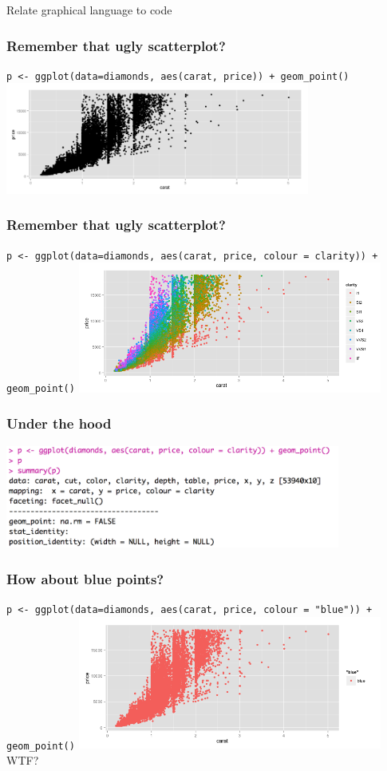 \documentclass{beamer}
\begin{document}
\begin{frame}
\begin{center}
Relate graphical language to code
\end{center}
\end{frame}

\begin{frame}\frametitle{Remember that ugly scatterplot?}
\footnotesize\texttt{p <- ggplot(data=diamonds, aes(carat, price)) + geom\_point()} 
\includegraphics[width=100mm,scale=0.5]{qplotbw.png}
\end{frame}


\begin{frame}\frametitle{Remember that ugly scatterplot?}
\footnotesize\texttt{p <- ggplot(data=diamonds, aes(carat, price, colour = clarity)) + geom\_point()} 
\includegraphics[width=100mm,scale=0.5]{qplot.png}
\end{frame}

\begin{frame}\frametitle{Under the hood}
\includegraphics[width=110mm,scale=0.5]{hood.png}
\end{frame}


\begin{frame}\frametitle{How about blue points?}
\footnotesize\texttt{p <- ggplot(data=diamonds, aes(carat, price, colour = "blue")) + geom\_point()} 
\includegraphics[width=100mm,scale=0.5]{qplotblue.png}
\alert{WTF?}
\end{frame}
\end{document}
